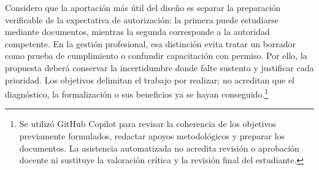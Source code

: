 {\par Considero que la aportación más útil del diseño es separar la preparación verificable de la expectativa de autorización: la primera puede estudiarse mediante documentos, mientras la segunda corresponde a la autoridad competente. En la gestión profesional, esa distinción evita tratar un borrador como prueba de cumplimiento o confundir capacitación con permiso. Por ello, la propuesta deberá conservar la incertidumbre donde falte sustento y justificar cada prioridad. Los objetivos delimitan el trabajo por realizar; no acreditan que el diagnóstico, la formalización o sus beneficios ya se hayan conseguido.\footnote{Se utilizó GitHub Copilot para revisar la coherencia de los objetivos previamente formulados, redactar apoyos metodológicos y preparar los documentos. La asistencia automatizada no acredita revisión o aprobación docente ni sustituye la valoración crítica y la revisión final del estudiante.}
}
